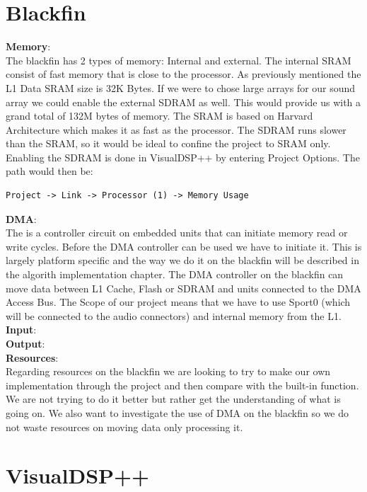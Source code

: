 \section{Blackfin}
\textbf{Memory}:\\
The blackfin has 2 types of memory: Internal and external. The internal SRAM consist of fast memory that is close to the processor.  As previously mentioned the L1 Data SRAM size is 32K Bytes. If we were to chose large arrays for our sound array we could enable the external SDRAM as well. This would provide us with a grand total of 132M bytes of memory. The SRAM is based on Harvard Architecture which makes it as fast as the processor. The SDRAM runs slower than the SRAM, so it would be ideal to confine the project to SRAM only. Enabling the SDRAM is done in VisualDSP++ by entering Project Options. The path would then be:
\begin{verbatim}
Project -> Link -> Processor (1) -> Memory Usage
\end{verbatim}
\textbf{DMA}:\\
The is a controller circuit on embedded units that can initiate memory read or write cycles. Before the DMA controller can be used we have to initiate it. This is largely platform specific and the way we do it on the blackfin will be described in the algorith implementation chapter. The DMA controller on the blackfin can move data between L1 Cache, Flash or SDRAM and units connected to the DMA Access Bus. The Scope of our project means that we have to use Sport0 (which will be connected to the audio connectors) and internal memory from the L1. \\
\textbf{Input}:\\
\textbf{Output}:\\
\textbf{Resources}:\\
Regarding resources on the blackfin we are looking to try to make our own implementation through the project and then compare with the built-in function. We are not trying to do it better but rather get the understanding of what is going on.
We also want to investigate the use of DMA on the blackfin so we do not waste resources on moving data only processing it.
\section{VisualDSP++}
